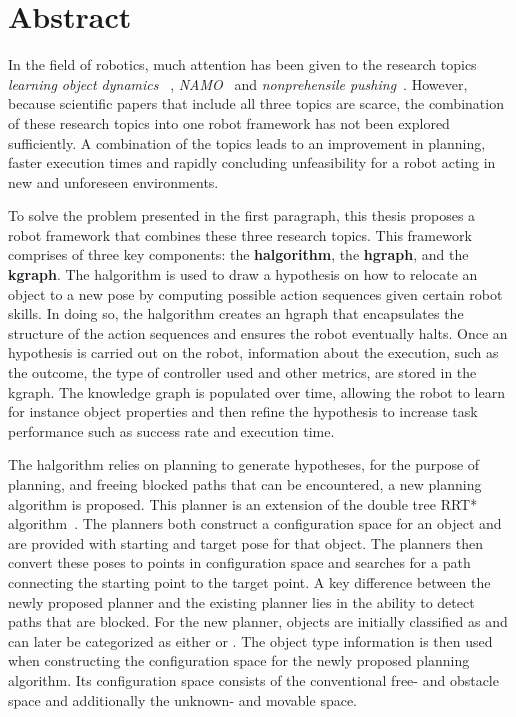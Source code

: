 \chapter*{Abstract}
In the field of robotics, much attention has been given to the research topics \textit{learning object dynamics}~\cite{cong_selfadapting_2020,seegmiller_vehicle_2013}
, \textit{\acf{NAMO}}~\cite{chen_fast_2018,elbanhawi_samplingbased_2014,kingston_samplingbased_2018,lavalle_planning_2006} and \textit{nonprehensile pushing}~\cite{arruda_uncertainty_2017,bauza_dataefficient_2018,mericli_pushmanipulation_2015,stuber_featurebased_2018,stuber_let_2020,toussaint_sequenceofconstraints_2022}. However, because scientific papers that include all three topics are scarce, the combination of these research topics into one robot framework has not been explored sufficiently. A combination of the topics leads to an improvement in planning, faster execution times and rapidly concluding unfeasibility for a robot acting in new and unforeseen environments.\bs

To solve the problem presented in the first paragraph, this thesis proposes a robot framework that combines these three research topics. This framework comprises of three key components: the \textbf{\acl{halgorithm}}, the \textbf{\acl{hgraph}}, and the \textbf{\acl{kgraph}}. The \acl{halgorithm} is used to draw a hypothesis on how to relocate an object to a new pose by computing possible action sequences given certain robot skills. In doing so, the \acl{halgorithm} creates an \acl{hgraph} that encapsulates the structure of the action sequences and ensures the robot eventually halts. Once an hypothesis is carried out on the robot, information about the execution, such as the outcome, the type of controller used and other metrics, are stored in the \acl{kgraph}. The knowledge graph is populated over time, allowing the robot to learn for instance object properties and then refine the hypothesis to increase task performance such as success rate and execution time.\bs

The \acl{halgorithm} relies on planning to generate hypotheses, for the purpose of planning, and freeing blocked paths that can be encountered, a new planning algorithm is proposed. This planner is an extension of the double tree \acl{RRT*} algorithm~\cite{chen_fast_2018}. The planners both construct a configuration space for an object and are provided with starting and target pose for that object. The planners then convert these poses to points in configuration space and searches for a path connecting the starting point to the target point. A key difference between the newly proposed planner and the existing planner lies in the ability to detect paths that are blocked. For the new planner, objects are initially classified as  and can later be categorized as either  or . The object type information is then used when constructing the configuration space for the newly proposed planning algorithm. Its configuration space consists of the conventional free- and obstacle space and additionally the unknown- and movable space.\bs

